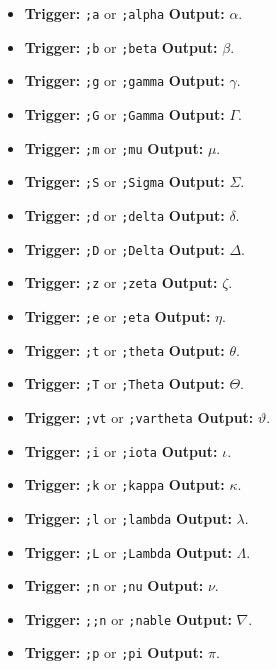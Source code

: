 \documentclass{article}
\begin{document}
\begin{itemize}[leftmargin=*, label={}]
\item \textbf{Trigger:} \texttt{;a} or \texttt{;alpha} \quad\textbf{Output:} $\alpha$.
\item \textbf{Trigger:} \texttt{;b} or \texttt{;beta} \quad\textbf{Output:} $\beta$.
\item \textbf{Trigger:} \texttt{;g} or \texttt{;gamma} \quad\textbf{Output:} $\gamma$.
\item \textbf{Trigger:} \texttt{;G} or \texttt{;Gamma} \quad\textbf{Output:} $\Gamma$.
\item \textbf{Trigger:} \texttt{;m} or \texttt{;mu} \quad\textbf{Output:} $\mu$.
\item \textbf{Trigger:} \texttt{;S} or \texttt{;Sigma} \quad\textbf{Output:} $\Sigma$.
\item \textbf{Trigger:} \texttt{;d} or \texttt{;delta} \quad\textbf{Output:} $\delta$.
\item \textbf{Trigger:} \texttt{;D} or \texttt{;Delta} \quad\textbf{Output:} $\Delta$.
\item \textbf{Trigger:} \texttt{;z} or \texttt{;zeta} \quad\textbf{Output:} $\zeta$.
\item \textbf{Trigger:} \texttt{;e} or \texttt{;eta} \quad\textbf{Output:} $\eta$.
\item \textbf{Trigger:} \texttt{;t} or \texttt{;theta} \quad\textbf{Output:} $\theta$.
\item \textbf{Trigger:} \texttt{;T} or \texttt{;Theta} \quad\textbf{Output:} $\Theta$.
\item \textbf{Trigger:} \texttt{;vt} or \texttt{;vartheta} \quad\textbf{Output:} $\vartheta$.
\item \textbf{Trigger:} \texttt{;i} or \texttt{;iota} \quad\textbf{Output:} $\iota$.
\item \textbf{Trigger:} \texttt{;k} or \texttt{;kappa} \quad\textbf{Output:} $\kappa$.
\item \textbf{Trigger:} \texttt{;l} or \texttt{;lambda} \quad\textbf{Output:} $\lambda$.
\item \textbf{Trigger:} \texttt{;L} or \texttt{;Lambda} \quad\textbf{Output:} $\Lambda$.
\item \textbf{Trigger:} \texttt{;n} or \texttt{;nu} \quad\textbf{Output:} $\nu$.
\item \textbf{Trigger:} \texttt{;;n} or \texttt{;nable} \quad\textbf{Output:} $\nabla$.
\item \textbf{Trigger:} \texttt{;p} or \texttt{;pi} \quad\textbf{Output:} $\pi$.

\end{itemize}
\end{document}
